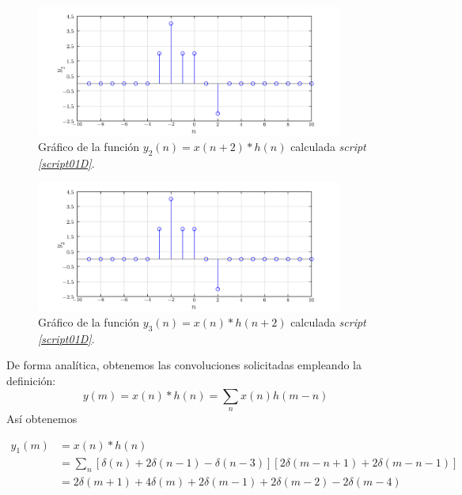 \documentclass[a4paper,12pt,final]{article}
\begin{document}
      \begin{figure}[H]
        \caption{Gráfico de la función $y_2\left(n\right)=x\left(n+2\right)*h\left(n\right)$ calculada \emph{script \ref{script01D}}.}
        \label{script01Efigure}
        \includegraphics[width=0.90\textwidth]{./laboratorio_3/problema01_y2.png}
      \end{figure}

      \begin{figure}[H]
        \caption{Gráfico de la función $y_3\left(n\right)=x\left(n\right)*h\left(n+2\right)$ calculada \emph{script \ref{script01D}}.}
        \label{script01Ffigure}
        \includegraphics[width=0.90\textwidth]{./laboratorio_3/problema01_y3.png}
      \end{figure}

      \noindent De forma analítica, obtenemos las convoluciones solicitadas empleando la definición:
      $$y\left(m\right) = x\left(n\right)*h\left(n\right) = \sum_n x\left(n\right)h\left(m-n\right)$$
      \noindent Así obtenemos

      \begin{equation*}
        \begin{split}
          y_1\left(m\right) & = x\left(n\right)*h\left(n\right) \\
                            & = \sum_n \left[\delta\left(n\right) + 2\delta\left(n-1\right) - \delta\left(n-3\right)\right]
                                       \left[2\delta\left(m-n+1\right) + 2\delta\left(m-n-1\right)\right] \\
                            & = 2\delta\left(m+1\right) + 4\delta\left(m\right) + 2\delta\left(m-1\right) + 2\delta\left(m-2\right) - 2\delta\left(m-4\right) \\
        \end{split}
      \end{equation*}
\end{document}
